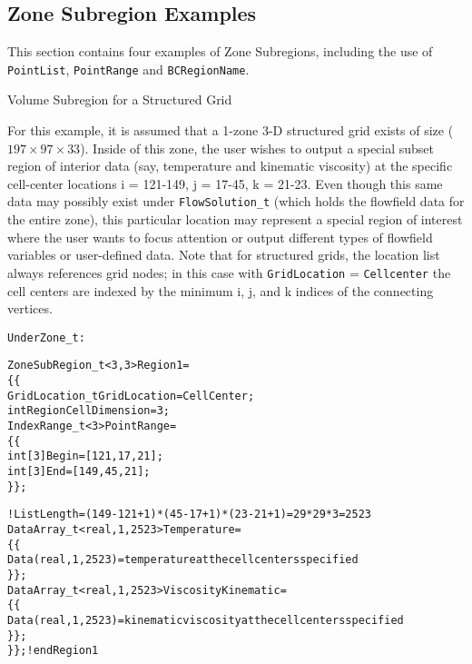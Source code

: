 \subsection{Zone Subregion Examples}
\label{s:zonesubregion_examples}

This section contains four examples of Zone Subregions, including
the use of \texttt{PointList}, \texttt{PointRange} and \texttt{BCRegionName}.

\begin{example}{Volume Subregion for a Structured Grid}
\label{ex:zonesubregion1}

For this example, it is assumed that a 1-zone 3-D structured grid exists
of size ($197 \times 97 \times 33$). Inside of this zone, the user wishes to output a
special subset region of interior data (say, temperature and kinematic viscosity)
at the specific cell-center locations i = 121-149, j = 17-45, k = 21-23.
Even though this same data may possibly exist under \texttt{FlowSolution\_t}
(which holds the flowfield data for the entire zone), this particular location
may represent a special region of interest where the user wants to focus attention
or output different types of flowfield variables or user-defined data.
Note that for structured grids, the location list always references grid nodes;
in this case with \texttt{GridLocation} = \texttt{Cellcenter} the cell centers
are indexed by the minimum i, j, and k indices of the connecting vertices.

\begin{alltt}
Under Zone\_t:

  ZoneSubRegion\_t<3,3> Region1 =
    \{\{
    GridLocation\_t GridLocation = CellCenter ;
    int RegionCellDimension = 3;
    IndexRange\_t<3> PointRange =
      \{\{
      int[3] Begin = [121,17,21];
      int[3] End = [149,45,21];
      \}\};

    ! ListLength = (149-121+1)*(45-17+1)*(23-21+1) = 29*29*3 = 2523
    DataArray\_t<real,1,2523> Temperature =
      \{\{
      Data(real,1,2523) = temperature at the cell centers specified
      \}\} ;
    DataArray\_t<real,1,2523> ViscosityKinematic =
      \{\{
      Data(real,1,2523) = kinematic viscosity at the cell centers specified
      \}\} ;
    \}\} ; ! end Region1
\end{alltt}

\end{example}

